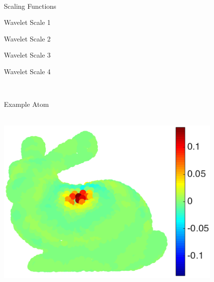 \documentclass[journal, 10pt]{IEEEtran}
\begin{document}


\begin{figure}[bth] 
\begin{minipage}[m]{0.16\linewidth}
~
\end{minipage}
\begin{minipage}[m]{0.16\linewidth}
\centerline{\small{Scaling Functions}}
\end{minipage}
\hspace{.01\linewidth}
\begin{minipage}[m]{0.16\linewidth}
\centerline{\small{Wavelet Scale 1~~~~}}
\end{minipage}
\begin{minipage}[m]{0.16\linewidth}
\centerline{\small{Wavelet Scale 2~~~~}}\end{minipage}
\begin{minipage}[m]{0.16\linewidth}
\centerline{\small{Wavelet Scale 3~~~~}}\end{minipage}
\begin{minipage}[m]{0.16\linewidth}
\centerline{\small{Wavelet Scale 4~~~~~}}\end{minipage} \\
\begin{minipage}[m]{0.16\linewidth}
\centerline{\small{Example Atom}}
\end{minipage}
\begin{minipage}[m]{0.16\linewidth}
\centerline{~~\includegraphics[width=.85\linewidth]{fig_bunny_atom_scalinga}}
\end{minipage}
\begin{minipage}[m]{0.16\linewidth}

\end{minipage}
\end{figure}
\end{document}
